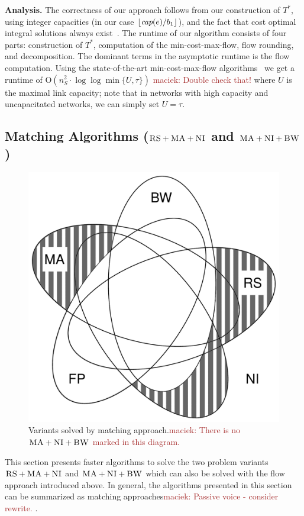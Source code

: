 \documentclass[9pt]{sigcomm-alternate}
\newcommand{\maciek}[1]{\textcolor{brown}{maciek: #1}}
\newcommand{\capacity}{\emph{cap}}
\newcommand{\CC}{\textsc{NI}}
\newcommand{\RS}{\textsc{RS}}
\newcommand{\BW}{\textsc{BW}}
\newcommand{\MA}{\textsc{MA}}
\newcommand{\Tree}{\ensuremath{T}}
\newcommand{\CostTrans}{\ensuremath{b_1}}
\begin{document}
\textbf{Analysis.}
The correctness of our approach follows from our construction
of $\Tree^*$, using integer capacities (in our case $\lfloor\capacity(e)/\CostTrans\rfloor$),
and the fact that cost optimal integral solutions always exist~\cite{flow-book}.
The runtime of our algorithm consists of four parts: construction of $\Tree^*$,
computation of the min-cost-max-flow, flow rounding, and decomposition. The
dominant terms in the asymptotic runtime is the flow computation.
Using the state-of-the-art min-cost-max-flow algorithms~\cite{mincostmaxflow-1,mincostmaxflow-2}
we get a runtime of $\mathrm{O}(n_S^2 \cdot \log\log \min \{U,\tau\})$ 
 \maciek{Double check that!}
where $U$ is the maximal link capacity; note that in networks with high capacity and uncapacitated networks, we can simply
 set $U=\tau$.


\subsection{Matching Algorithms ($\RS+\MA+\CC$ and $\MA+\CC+\BW$)}\label{ssec:match}

\begin{figure}
\includegraphics[width=0.48\columnwidth]{figs/venn_matching.pdf}
\caption{Variants solved by matching approach.\maciek{There is no $\MA+\CC+\BW$ marked in this diagram.}}
\label{fig:venn_match}
\end{figure}

This section presents faster algorithms to solve the two problem variants
$\RS+\MA+\CC$ and $\MA+\CC+\BW$ which can also be solved with the flow approach
introduced above.
In general, the algorithms presented in this section can be summarized
as matching approaches\maciek{Passive voice - consider rewrite.}
.
\end{document}
